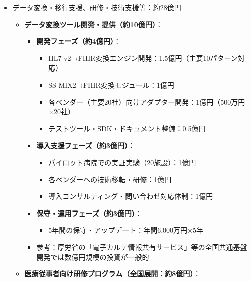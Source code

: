 \documentclass[
  a4paper,
  a4paper,
  11pt]{ltjsbook}
\providecommand{\tightlist}{%
  \setlength{\itemsep}{0pt}\setlength{\parskip}{0pt}}
\begin{document}
\begin{tcolorbox}
\begin{enumerate}
\begin{itemize}
    \begin{itemize}
    \tightlist
    \item
      日本医師会総合政策研究機構の2023年度調査によると、279地域でネットワークが運用中{[}110{]}
    \item
      同調査では、1ネットワークあたりの平均構築費用（累計）は2億5,409万1千円、2024年度の平均年間運営予算は1,185万円と報告されている{[}110{]}
    \item
      相互接続・標準化対応改修：既存システム構築費用の約20\%程度と想定（平均構築費用2.54億円の20\%
      = 約5,000万円/地域）× 279地域 = 約140億円
    \end{itemize}
  \item
    データ変換・移行支援、研修・技術支援等：約28億円

    \begin{itemize}
    \tightlist
    \item
      \textbf{データ変換ツール開発・提供（約10億円）}：

      \begin{itemize}
      \tightlist
      \item
        \textbf{開発フェーズ（約4億円）}：

        \begin{itemize}
        \tightlist
        \item
          HL7 v2→FHIR変換エンジン開発：1.5億円（主要10パターン対応）
        \item
          SS-MIX2→FHIR変換モジュール：1億円
        \item
          各ベンダー（主要20社）向けアダプター開発：1億円（500万円×20社）
        \item
          テストツール・SDK・ドキュメント整備：0.5億円
        \end{itemize}
      \item
        \textbf{導入支援フェーズ（約3億円）}：

        \begin{itemize}
        \tightlist
        \item
          パイロット病院での実証実験（20施設）：1億円
        \item
          各ベンダーへの技術移転・研修：1億円
        \item
          導入コンサルティング・問い合わせ対応体制：1億円
        \end{itemize}
      \item
        \textbf{保守・運用フェーズ（約3億円）}：

        \begin{itemize}
        \tightlist
        \item
          5年間の保守・アップデート：年間6,000万円×5年
        \end{itemize}
      \item
        参考：厚労省の「電子カルテ情報共有サービス」等の全国共通基盤開発では数億円規模の投資が一般的
      \end{itemize}
    \item
      \textbf{医療従事者向け研修プログラム（全国展開：約8億円）}：


\end{itemize}
\end{itemize}
\end{enumerate}
\end{tcolorbox}
\end{document}
